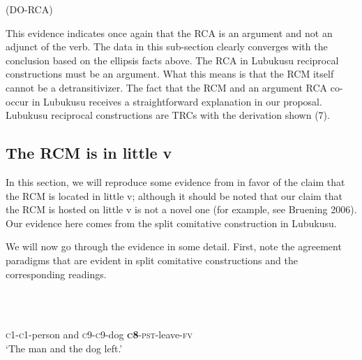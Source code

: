                       (DO-RCA)

This evidence indicates once again that the RCA is an argument and not an adjunct of the verb. The data in this sub-section clearly converges with the conclusion based on the ellipsis facts above. The RCA in Lubukusu reciprocal constructions must be an argument. What this means is that the RCM itself cannot be a detransitivizer. The fact that the RCM and an argument RCA co-occur in Lubukusu receives a straightforward explanation in our proposal. Lubukusu reciprocal constructions are TRCs with the derivation shown (7). 

\setcounter{listWWviiiNumxxviileveli}{0}
\begin{listWWviiiNumxxviileveli}
\item \setcounter{listWWviiiNumxxviilevelii}{0}
\begin{listWWviiiNumxxviilevelii}
\item \subsection{ The RCM is in little v}\end{listWWviiiNumxxviilevelii}
\end{listWWviiiNumxxviileveli}

In this section, we will reproduce some evidence from \citet{BakerEtAl2013} in favor of the claim that the RCM is located in little v; although it should be noted that our claim that the RCM is hosted on little v is not a novel one (for example, see Bruening 2006). Our evidence here comes from the split comitative construction in Lubukusu. 

  We will now go through the evidence in some detail. First, note the agreement paradigms that are evident in split comitative constructions and the corresponding readings. 

\setcounter{listWWviiiNumxlileveli}{0}
\begin{listWWviiiNumxlileveli}
\item \ea\label{ex:}
\\
\ea\label{ex:}
\\
\end{listWWviiiNumxlileveli}
       \textsc{c1-c1}{}-person   and  \textsc{c9-c9}{}-dog   \textbf{\textsc{c}}\textbf{8}{}-\textsc{pst}{}-leave-\textsc{fv} \\
\glt   ‘The man and the dog left.’
\z

